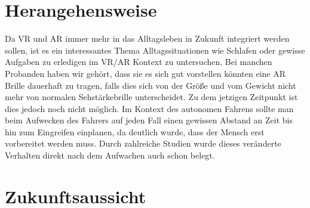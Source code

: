 
\section{Herangehensweise}

Da VR und AR immer mehr in das Alltagsleben in Zukunft integriert werden sollen, ist es ein interessantes Thema Alltagssituationen wie Schlafen oder gewisse Aufgaben zu erledigen im VR/AR Kontext zu untersuchen. Bei manchen Probanden haben wir gehört, dass sie es sich gut vorstellen könnten eine AR Brille dauerhaft zu tragen, falls dies sich von der Größe und vom Gewicht nicht mehr von normalen Sehstärkebrille unterscheidet. Zu dem jetzigen Zeitpunkt ist dies jedoch noch nicht möglich.
Im Kontext des autonomen Fahrens sollte man beim Aufwecken des Fahrers auf jeden Fall einen gewissen Abstand an Zeit bis hin zum Eingreifen einplanen, da deutlich wurde, dass der Mensch erst vorbereitet werden muss. Durch zahlreiche Studien wurde dieses veränderte Verhalten direkt nach dem Aufwachen auch schon belegt.

\section{Zukunftsaussicht}


